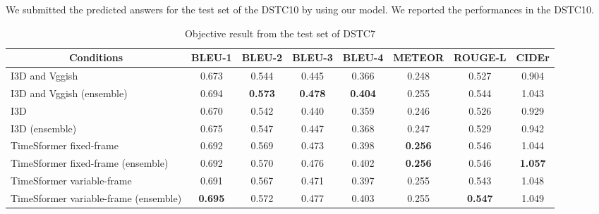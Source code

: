 \documentclass[letterpaper]{article}
\begin{document}
We submitted the predicted answers for the test set of the DSTC10 by using our model.
We reported the performances in the DSTC10.

\begin{table}[t]
  \centering
  \small
  \caption{Objective result from the test set of DSTC7}
  \label{tab:dstc7_result}
  \begin{adjustbox}{width=0.58\columnwidth}
\begin{tabular}{l|ccccccc}\hline
    \multicolumn{1}{c|}{Conditions} & BLEU-1 & BLEU-2 & BLEU-3 & BLEU-4 & METEOR & ROUGE-L & CIDEr \\ \hline
    I3D and Vggish \cite{Li2021bridging} & 0.673 & 0.544 & 0.445 & 0.366 & 0.248 & 0.527 & 0.904 \\
    I3D and Vggish (ensemble) & 0.694 & \textbf{0.573} & \textbf{0.478} & \textbf{0.404} & 0.255 & 0.544 & 1.043 \\
    I3D & 0.670 & 0.542 & 0.440 & 0.359 & 0.246 & 0.526 & 0.929 \\
    I3D (ensemble) & 0.675 & 0.547 & 0.447 & 0.368 & 0.247 & 0.529 & 0.942 \\
    TimeSformer fixed-frame & 0.692 & 0.569 & 0.473 & 0.398 & \textbf{0.256} & 0.546 & 1.044 \\
    TimeSformer fixed-frame (ensemble) & 0.692 & 0.570 & 0.476 & 0.402 & \textbf{0.256} & 0.546 & \textbf{1.057} \\
    TimeSformer variable-frame & 0.691 & 0.567 & 0.471 & 0.397 & 0.255 & 0.543 & 1.048 \\
    TimeSformer variable-frame (ensemble) & \textbf{0.695} & 0.572 & 0.477 & 0.403 & 0.255 & \textbf{0.547} & 1.049 \\ \hline
  \end{tabular}
\end{adjustbox}


\end{table}
\end{document}
